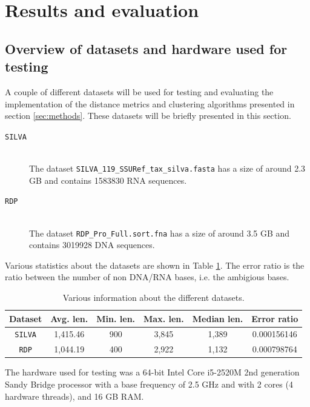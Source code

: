 \section{Results and evaluation} \label{sec:results}

\subsection{Overview of datasets and hardware used for testing}
\label{sec:overview_of_datasets}

A couple of different datasets will be used for testing and evaluating the
implementation of the distance metrics and clustering algorithms presented in
section \ref{sec:methods}. These datasets will be briefly presented in this
section.

\begin{description}
  \item[\texttt{SILVA}] \hfill \\
    The dataset \texttt{SILVA\_119\_SSURef\_tax\_silva.fasta} has a size of
    around 2.3 GB and contains \num{1583830} RNA sequences.

  \item[\texttt{RDP}] \hfill \\
    The dataset \texttt{RDP\_Pro\_Full.sort.fna} has a size of around 3.5 GB
    and contains \num{3019928} DNA sequences.
\end{description}

Various statistics about the datasets are shown in Table \ref{tab:data_stats}.
The error ratio is the ratio between the number of non DNA/RNA bases, i.e. the
ambigious bases.

\begin{table}[H]
  \centering
  \begin{tabular}{c | c | c | c | c | c}
    Dataset        & Avg. len. & Min. len. & Max. len. & Median len. & Error ratio \\
    \hline\hline
    \texttt{SILVA} & 1,415.46  & 900       & 3,845     & 1,389       & 0.000156146 \\
    \texttt{RDP}   & 1,044.19  & 400       & 2,922     & 1,132       & 0.000798764 \\
  \end{tabular}
  \caption{Various information about the different datasets.}
  \label{tab:data_stats}
\end{table}

The hardware used for testing was a 64-bit Intel Core i5-2520M 2nd generation
Sandy Bridge processor with a base frequency of 2.5 GHz and with 2 cores (4
hardware threads), and 16 GB RAM.


